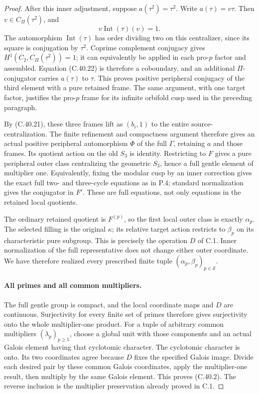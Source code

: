 \begin{proof}
After this inner adjustment, suppose
$a(\tau^2)=\tau^2$. Write $a(\tau)=v\tau$.
Then $v\in C_\Pi(\tau^2)$, and
\[
                  v\operatorname{Int}(\tau)(v)=1.
                                                        \tag{C.40.22}
\]
The automorphism $\operatorname{Int}(\tau)$ has
order dividing two on this centralizer, since
its square is conjugation by $\tau^2$.
Coprime complement conjugacy gives
$H^1(C_2,C_\Pi(\tau^2))=1$; it can equivalently
be applied in each pro-$p$ factor and assembled.
Equation (C.40.22) is therefore a coboundary,
and an additional $\Pi$-conjugator carries
$a(\tau)$ to $\tau$. This proves positive peripheral
conjugacy of the third element with a pure retained
frame. The same argument, with one target factor,
justifies the pro-$p$ frame for its infinite
orbifold cusp used in the preceding paragraph.

By (C.40.21), these three frames lift as
$(b_i,1)$ to the entire source-centralization.
The finite refinement and compactness argument
therefore gives an actual positive peripheral
automorphism $\Phi$ of the full $\Gamma$, retaining
$a$ and those frames. Its quotient action on the
old $S_3$ is identity. Restricting to $F$ gives
a pure peripheral outer class centralizing the
geometric $S_3$, hence a full gentle element of
multiplier one. Equivalently, fixing the modular
cusp by an inner correction gives the exact full
two- and three-cycle equations as in P.4; standard
normalization gives the conjugator in $F'$.
These are full equations, not only equations in
the retained local quotients.

The ordinary retained quotient is $F^{(p)}$, so
the first local outer class is exactly $\alpha_p$.
The selected filling is the original $\kappa$;
its relative target action restricts to
$\beta_p$ on its characteristic pure subgroup.
This is precisely the operation $D$ of C.1.
Inner normalization of the full representative
does not change either outer coordinate. We have
therefore realized every prescribed finite tuple
$(\alpha_p,\beta_p)_{p\in\mathcal S}$.

\paragraph{All primes and all common multipliers.}
The full gentle group is compact, and the local
coordinate maps and $D$ are continuous. Surjectivity
for every finite set of primes therefore gives
surjectivity onto the whole multiplier-one product.
For a tuple of arbitrary common multipliers
$(\lambda_p)_{p\geq5}$, choose a global unit with
those components and an actual Galois element
having that cyclotomic character. The cyclotomic
character is onto. Its two coordinates agree
because $D$ fixes the specified Galois image.
Divide each desired pair by these common Galois
coordinates, apply the multiplier-one result,
then multiply by the same Galois element.
This proves (C.40.2). The reverse inclusion is
the multiplier preservation already proved in C.1.
\end{proof}
